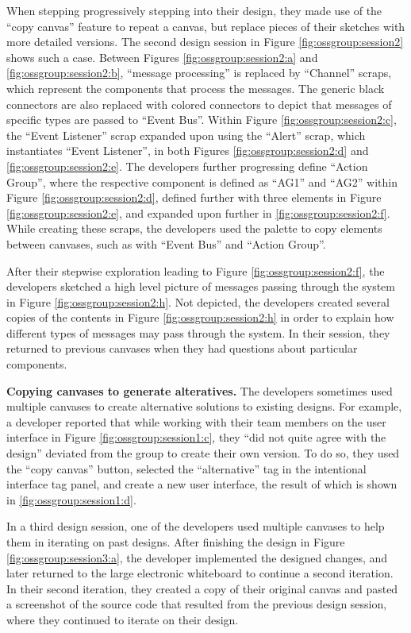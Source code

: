 When stepping progressively stepping into their design, they made use of the ``copy canvas'' feature to repeat a canvas, but replace pieces of their sketches with more detailed versions. The second design session in Figure \ref{fig:ossgroup:session2} shows such a case. Between Figures \ref{fig:ossgroup:session2:a} and \ref{fig:ossgroup:session2:b}, ``message processing'' is replaced by ``Channel'' scraps, which represent the components that process the messages. The generic black connectors are also replaced with colored connectors to depict that messages of specific types are passed to ``Event Bus''. Within Figure \ref{fig:ossgroup:session2:c}, the ``Event Listener'' scrap expanded upon using the ``Alert'' scrap, which instantiates ``Event Listener'', in both Figures \ref{fig:ossgroup:session2:d} and \ref{fig:ossgroup:session2:e}. The developers further progressing define ``Action Group'', where the respective component is defined as ``AG1'' and ``AG2'' within Figure \ref{fig:ossgroup:session2:d}, defined further with three elements in Figure \ref{fig:ossgroup:session2:e}, and expanded upon further in \ref{fig:ossgroup:session2:f}. While creating these scraps, the developers used the palette to copy elements between canvases, such as with ``Event Bus'' and ``Action Group''.

After their stepwise exploration leading to Figure \ref{fig:ossgroup:session2:f}, the developers sketched a high level picture of messages passing through the system in Figure \ref{fig:ossgroup:session2:h}. Not depicted, the developers created several copies of the contents in Figure \ref{fig:ossgroup:session2:h} in order to explain how different types of messages may pass through the system. In their session, they returned to previous canvases when they had questions about particular components.

\textbf{Copying canvases to generate alteratives. } The developers sometimes used multiple canvases to create alternative solutions to existing designs. For example, a developer reported that while working with their team members on the user interface in Figure \ref{fig:ossgroup:session1:c}, they ``did not quite agree with the design'' deviated from the group to create their own version. To do so, they used the ``copy canvas'' button, selected the ``alternative'' tag in the intentional interface tag panel, and create a new user interface, the result of which is shown in  \ref{fig:ossgroup:session1:d}. 

In a third design session, one of the developers used multiple canvases to help them in iterating on past designs. After finishing the design in Figure \ref{fig:ossgroup:session3:a}, the developer implemented the designed changes, and later returned to the large electronic whiteboard to continue a second iteration. In their second iteration, they created a copy of their original canvas and pasted a screenshot of the source code that resulted from the previous design session, where they continued to iterate on their design.

